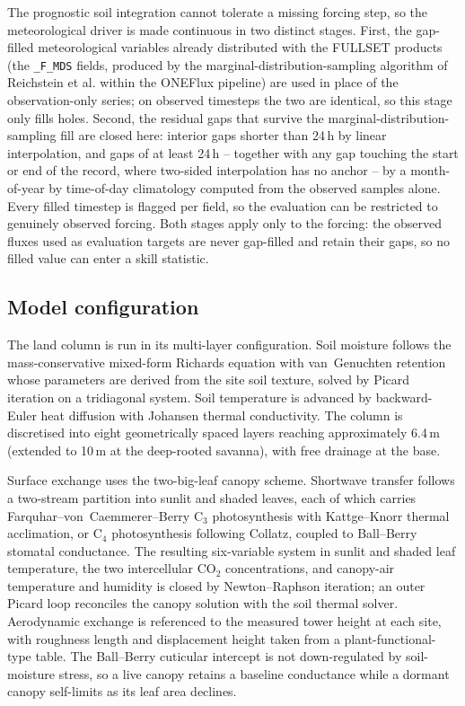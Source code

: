 The prognostic soil integration cannot tolerate a missing forcing step, so the
meteorological driver is made continuous in two distinct stages. First, the
gap-filled meteorological variables already distributed with the FULLSET products
(the \texttt{\_F\_MDS} fields, produced by the marginal-distribution-sampling
algorithm of Reichstein et al.\cite{Reichstein2005} within the ONEFlux
pipeline\cite{Pastorello2020}) are used in place of the observation-only series;
on observed timesteps the two are identical, so this stage only fills holes.
Second, the residual gaps that survive the marginal-distribution-sampling fill
are closed here: interior gaps shorter than 24\,h by linear interpolation, and
gaps of at least 24\,h -- together with any gap touching the start or end of the
record, where two-sided interpolation has no anchor -- by a month-of-year by
time-of-day climatology computed from the observed samples alone. Every filled
timestep is flagged per field, so the evaluation can be restricted to genuinely
observed forcing. Both stages apply only to the forcing: the observed fluxes used
as evaluation targets are never gap-filled and retain their gaps, so no filled
value can enter a skill statistic.

\subsection{Model configuration}

The land column is run in its multi-layer configuration. Soil moisture follows
the mass-conservative mixed-form Richards equation\cite{Celia1990} with
van~Genuchten retention\cite{VanGenuchten1980} whose parameters are derived from
the site soil texture, solved by Picard iteration on a tridiagonal system. Soil
temperature is advanced by backward-Euler heat diffusion with Johansen thermal
conductivity\cite{Johansen1975}. The column is discretised into eight
geometrically spaced layers reaching approximately 6.4\,m (extended to 10\,m at
the deep-rooted savanna), with free drainage at the base.

Surface exchange uses the two-big-leaf canopy scheme. Shortwave transfer follows
a two-stream partition into sunlit and shaded leaves\cite{Sellers1985,Ryu2011},
each of which carries Farquhar--von~Caemmerer--Berry C$_3$
photosynthesis\cite{Farquhar1980} with Kattge--Knorr thermal
acclimation\cite{KattgeKnorr2007}, or C$_4$ photosynthesis following
Collatz\cite{Collatz1992}, coupled to Ball--Berry stomatal
conductance\cite{Ball1987}. The resulting six-variable system in sunlit and
shaded leaf temperature, the two intercellular CO$_2$ concentrations, and
canopy-air temperature and humidity is closed by Newton--Raphson iteration; an
outer Picard loop reconciles the canopy solution with the soil thermal solver.
Aerodynamic exchange is referenced to the measured tower height at each site,
with roughness length and displacement height taken from a plant-functional-type
table. The Ball--Berry cuticular intercept is not down-regulated by soil-moisture
stress, so a live canopy retains a baseline conductance while a dormant canopy
self-limits as its leaf area declines.

